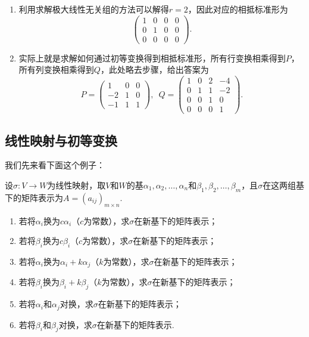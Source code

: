 \begin{solution}
    \begin{enumerate}
        \item 利用求解极大线性无关组的方法可以解得$r=2$，因此对应的相抵标准形为
              \[\begin{pmatrix}
                      1 & 0 & 0 & 0 \\ 0 & 1 & 0 & 0 \\ 0 & 0 & 0 & 0
                  \end{pmatrix}.\]

        \item 实际上就是求解如何通过初等变换得到相抵标准形，所有行变换相乘得到$P$，所有列变换相乘得到$Q$，此处略去步骤，给出答案为
              \[P=\begin{pmatrix}
                      1 & 0 & 0 \\ -2 & 1 & 0 \\ -1 & 1 & 1
                  \end{pmatrix},\enspace Q=\begin{pmatrix}
                      1 & 0 & 2 & -4 \\ 0 & 1 & 1 & -2 \\ 0 & 0 & 1 & 0 \\ 0 & 0 & 0 & 1
                  \end{pmatrix}.\]
    \end{enumerate}
\end{solution}

\subsection{线性映射与初等变换}

我们先来看下面这个例子：
\begin{example}{}{}
    设$\sigma:V\to W$为线性映射，取$V$和$W$的基$\alpha_1,\alpha_2,\ldots,\alpha_n$和$\beta_1,\beta_2,\ldots,\beta_m$，且$\sigma$在这两组基下的矩阵表示为$A=(a_{ij})_{m\times n}$.
    \begin{enumerate}
        \item 若将$\alpha_i$换为$c\alpha_i$（$c$为常数），求$\sigma$在新基下的矩阵表示；

        \item 若将$\beta_i$换为$c\beta_i$（$c$为常数），求$\sigma$在新基下的矩阵表示；

        \item 若将$\alpha_i$换为$\alpha_i+k\alpha_j$（$k$为常数），求$\sigma$在新基下的矩阵表示；

        \item 若将$\beta_i$换为$\beta_i+k\beta_j$（$k$为常数），求$\sigma$在新基下的矩阵表示；

        \item 若将$\alpha_i$和$\alpha_j$对换，求$\sigma$在新基下的矩阵表示；

        \item 若将$\beta_i$和$\beta_j$对换，求$\sigma$在新基下的矩阵表示.
    \end{enumerate}
\end{example}

